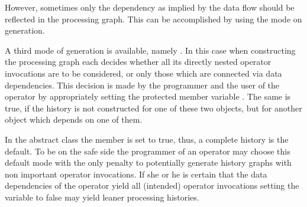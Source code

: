 However, 
sometimes
only the dependency as implied by the data flow should
be reflected in the processing graph. This can be accomplished by 
using the mode  on
generation. 


A third mode of generation is available, namely .
In this case when constructing the processing graph each  decides
whether all its directly nested operator invocations are to be considered,
or only those which are connected via data dependencies.
This decision is made by the programmer and the user of the operator
by appropriately setting the protected member variable .
The same is true, if the history is not constructed for one of these two
objects, but for another object which
depends on one of them.

In the abstract class  the member  is
set to true, thus, a complete history is the default.
To be on the safe side the programmer of an operator may choose this
default mode with the only penalty to potentially generate history graphs
with non important operator invocations.
If she or he is certain that the data dependencies of the operator yield
all (intended) operator invocations setting the variable to false may
yield leaner processing histories.

